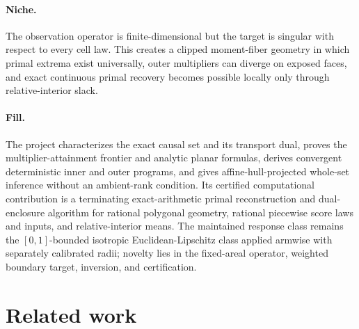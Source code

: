 \documentclass{article}
\begin{document}
\paragraph{Niche.} The observation operator is finite-dimensional but the target is singular with respect to every cell law. This creates a clipped moment-fiber geometry in which primal extrema exist universally, outer multipliers can diverge on exposed faces, and exact continuous primal recovery becomes possible locally only through relative-interior slack.

\paragraph{Fill.} The project characterizes the exact causal set and its transport dual, proves the multiplier-attainment frontier and analytic planar formulas, derives convergent deterministic inner and outer programs, and gives affine-hull-projected whole-set inference without an ambient-rank condition. Its certified computational contribution is a terminating exact-arithmetic primal reconstruction and dual-enclosure algorithm for rational polygonal geometry, rational piecewise score laws and inputs, and relative-interior means. The maintained response class remains the \([0,1]\)-bounded isotropic Euclidean-Lipschitz class applied armwise with separately calibrated radii; novelty lies in the fixed-areal operator, weighted boundary target, inversion, and certification.

\section{Related work}
\end{document}
